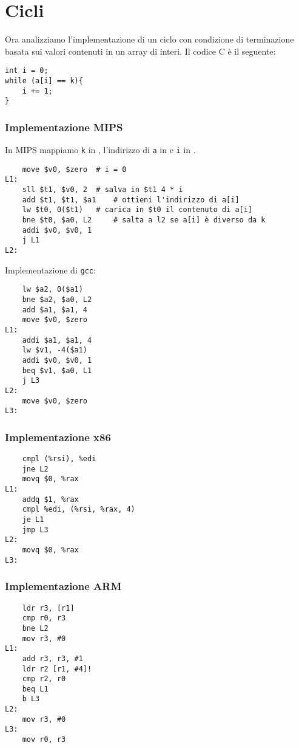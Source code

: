 \documentclass[class=book, crop=false, oneside]{standalone}
\begin{document}
\section{Cicli}
Ora analizziamo l'implementazione di un ciclo con condizione di terminazione basata sui valori contenuti in un array di interi. Il codice C è il seguente:
\begin{verbatim}
int i = 0;
while (a[i] == k){
	i += 1;
}
\end{verbatim}

\subsubsection{Implementazione MIPS}
In MIPS mappiamo \texttt{k} in , l'indirizzo di \texttt{a} in e \texttt{i} in .

\begin{verbatim}
	move $v0, $zero	 # i = 0
L1:
	sll $t1, $v0, 2	 # salva in $t1 4 * i
	add $t1, $t1, $a1	 # ottieni l'indirizzo di a[i]
	lw $t0, 0($t1)	 # carica in $t0 il contenuto di a[i]
	bne $t0, $a0, L2	 # salta a l2 se a[i] è diverso da k
	addi $v0, $v0, 1
	j L1
L2:
\end{verbatim}

Implementazione di \texttt{gcc}:
\begin{verbatim}
	lw $a2, 0($a1)
	bne $a2, $a0, L2
	add $a1, $a1, 4
	move $v0, $zero
L1:
	addi $a1, $a1, 4
	lw $v1, -4($a1)
	addi $v0, $v0, 1
	beq $v1, $a0, L1
	j L3
L2:
	move $v0, $zero
L3:
\end{verbatim}

\subsubsection{Implementazione x86}
\begin{verbatim}
	cmpl (%rsi), %edi
	jne L2
	movq $0, %rax
L1:
	addq $1, %rax
	cmpl %edi, (%rsi, %rax, 4)
	je L1
	jmp L3
L2:
	movq $0, %rax
L3:
\end{verbatim}

\subsubsection{Implementazione ARM}
\begin{verbatim}
	ldr r3, [r1]
	cmp r0, r3
	bne L2
	mov r3, #0
L1:
	add r3, r3, #1
	ldr r2 [r1, #4]!
	cmp r2, r0
	beq L1
	b L3
L2:
	mov r3, #0
L3:
	mov r0, r3
\end{verbatim}
\end{document}
